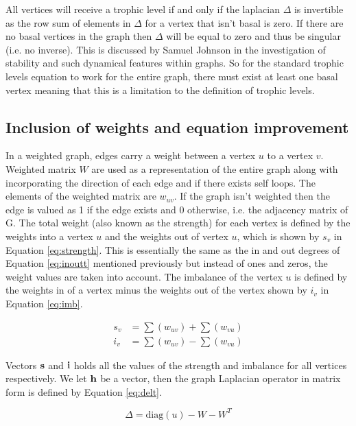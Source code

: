 All vertices will receive a trophic level if and only if the laplacian $\Delta$ is invertible as the row sum of elements in $\Delta$ for a vertex that isn't basal is zero. If there are no basal vertices in the graph then $\Delta$ will be equal to zero and thus be singular (i.e. no inverse). This is discussed by Samuel Johnson \cite{johnson2020digraphs} in the investigation of stability and such dynamical features within graphs. So for the standard trophic levels equation to work for the entire graph, there must exist at least one basal vertex meaning that this is a limitation to the definition of trophic levels.

\subsection{Inclusion of weights and equation improvement}
In a weighted graph, edges carry a weight between a vertex $u$ to a vertex $v$. Weighted matrix $W$ are used as a representation of the entire graph along with incorporating the direction of each edge and if there exists self loops. The elements of the weighted matrix are $w_{uv}$. If the graph isn't weighted then the edge is valued as 1 if the edge exists and 0 otherwise, i.e. the adjacency matrix of G. The total weight (also known as the strength) for each vertex is defined by the weights into a vertex $u$ and the weights out of vertex $u$, which is shown by $s_v$ in Equation \ref{eq:strength}. This is essentially the same as the in and out degrees of Equation \ref{eq:inoutt} mentioned previously but instead of ones and zeros, the weight values are taken into account. The imbalance of the vertex $u$ is defined by the weights in of a vertex minus the weights out of the vertex shown by $i_v$ in Equation \ref{eq:imb}.

\begin{align}
s_v &= \sum(w_{uv}) + \sum(w_{vu}) \label{eq:strength} \\
i_v &= \sum(w_{uv}) - \sum(w_{vu}) \label{eq:imb}
\end{align}

Vectors $\bold{s}$ and $\bold{i}$ holds all the values of the strength and imbalance for all vertices respectively. We let $\bold{h}$ be a vector, then the graph Laplacian operator in matrix form is defined by Equation \ref{eq:delt}.  

\begin{equation} \label{eq:delt}
\Delta = \text{diag}(u) - W - W^T
\end{equation}

